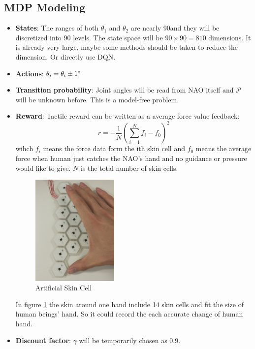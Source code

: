 \documentclass[a4paper, 11pt]{article} %
\begin{document}
\subsection{MDP Modeling}
\begin{itemize}
\item \textbf{States}: The ranges of both $\theta_1$ and $\theta_2$ are nearly 90\degree and they will be discretized into 90 levels. The state space will be $90 \times 90 = 810$ dimensions. It is already very large, maybe some methods should be taken to reduce the dimension. Or directly use DQN. 

\item \textbf{Actions}: $\theta_{i} = \theta_{i} \pm 1 \degree$ 
\item \textbf{Transition probability}: Joint angles will be read from NAO itself and $\mathcal{P}$ will be unknown before. This is a model-free problem.
\item \textbf{Reward}: Tactile reward can be written as a average force value feedback:
\[
r=-\frac{1}{N}(\sum_{i=1}^{N} f_{i}-f_{0})^2 
\]
wihch $f_{i}$ means the force data form the ith skin cell and $f_{0}$ means the average force when human just catches the NAO's hand and no guidance or pressure would like to give.
$N$ is the total number of skin cells.
\begin{figure} %
  \begin{center}
    \includegraphics[width=0.4\textwidth]{skin.jpeg}
  \end{center}
  \caption{Artificial Skin Cell}
  \label{fig:skin} 
\end{figure}

In figure \ref{fig:skin} the skin around one hand include 14 skin cells and fit the size of human beings' hand. So it could record the each accurate change of human hand. 
\item \textbf{Discount factor}:  $\gamma$ will be temporarily chosen as 0.9.
\end{itemize}
\end{document}
